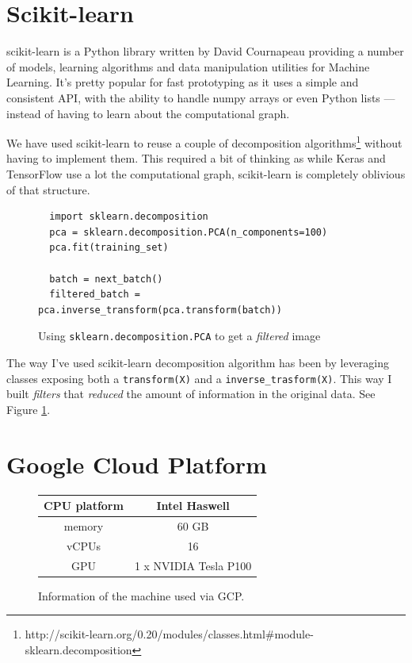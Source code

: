 \section{Scikit-learn}
\label{sec:sklearn}

scikit-learn is a Python library written by David Cournapeau providing
a number of models, learning algorithms and data manipulation utilities
for Machine Learning. It's pretty popular for fast prototyping as it
uses a simple and consistent API, with the ability to handle numpy
arrays or even Python lists --- instead of having to learn about the
computational graph.

We have used scikit-learn to reuse a couple of decomposition
algorithms\footnote{http://scikit-learn.org/0.20/modules/classes.html\#module-sklearn.decomposition}
without having to implement them. This required a bit of thinking as
while Keras and TensorFlow use a lot the computational graph,
scikit-learn is completely oblivious of that structure.

\begin{figure}
  \begin{verbatim}
  import sklearn.decomposition
  pca = sklearn.decomposition.PCA(n_components=100)
  pca.fit(training_set)

  batch = next_batch()
  filtered_batch = pca.inverse_transform(pca.transform(batch))
  \end{verbatim}
  \caption{Using \texttt{sklearn.decomposition.PCA} to get a
    \emph{filtered} image}
  \label{fig:transform-inverse_transform}
\end{figure}

The way I've used scikit-learn decomposition algorithm has been by
leveraging classes exposing both a \texttt{transform(X)} and a
\texttt{inverse\_trasform(X)}. This way I built \emph{filters} that
\emph{reduced} the amount of information in the original data. See
Figure \ref{fig:transform-inverse_transform}.

\section{Google Cloud Platform}
\label{sec:google-cloud-platform}

\begin{figure}
  \centering
  \begin{tabular}{|c|c|}
    \hline
    CPU platform & Intel Haswell \\
    \hline
    memory & 60 GB \\
    \hline
    vCPUs & 16 \\
    \hline
    GPU & 1 x NVIDIA Tesla P100 \\
    \hline
  \end{tabular}
  \caption{Information of the machine used via GCP.}
  \label{fig:expensive-machine}
\end{figure}


